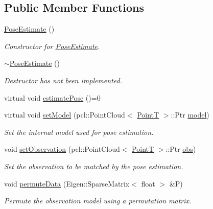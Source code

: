 \subsection*{\-Public \-Member \-Functions}
\begin{DoxyCompactItemize}
\item 
\hyperlink{classPoseEstimate_ac3e3718fe27dccb3be0760d6bcdc18c6}{\-Pose\-Estimate} ()
\begin{DoxyCompactList}\small\item\em \-Constructor for \hyperlink{classPoseEstimate}{\-Pose\-Estimate}. \end{DoxyCompactList}\item 
\hyperlink{classPoseEstimate_ac024bd041a98d233647f106e6878d986}{$\sim$\-Pose\-Estimate} ()
\begin{DoxyCompactList}\small\item\em \-Destructor has not been implemented. \end{DoxyCompactList}\item 
virtual void \hyperlink{classPoseEstimate_a6fdf8eec3cadac69bcf8181c89d82903}{estimate\-Pose} ()=0
\item 
virtual void \hyperlink{classPoseEstimate_a4c420a20ba20719f7c19b8bbec79b6d9}{set\-Model} (pcl\-::\-Point\-Cloud$<$ \hyperlink{common_8h_abd10555a534258e2739a38c928ef5db1}{\-Point\-T} $>$\-::\-Ptr \hyperlink{classPoseEstimate_aca9217cfe0d272f172f65adfc31764f1}{model})
\begin{DoxyCompactList}\small\item\em \-Set the internal model used for pose estimation. \end{DoxyCompactList}\item 
void \hyperlink{classPoseEstimate_ae884275e741789db776be52f373f387f}{set\-Observation} (pcl\-::\-Point\-Cloud$<$ \hyperlink{common_8h_abd10555a534258e2739a38c928ef5db1}{\-Point\-T} $>$\-::\-Ptr \hyperlink{classPoseEstimate_a75beb14fe9fd10fc8a80eff84f348c1c}{obs})
\begin{DoxyCompactList}\small\item\em \-Set the observation to be matched by the pose estimation. \end{DoxyCompactList}\item 
void \hyperlink{classPoseEstimate_a9daadf84954e07d295c2286172f01904}{permute\-Data} (\-Eigen\-::\-Sparse\-Matrix$<$ float $>$ \&\-P)
\begin{DoxyCompactList}\small\item\em \-Permute the observation model using a permutation matrix. \end{DoxyCompactList}\item 

\end{DoxyCompactItemize}
